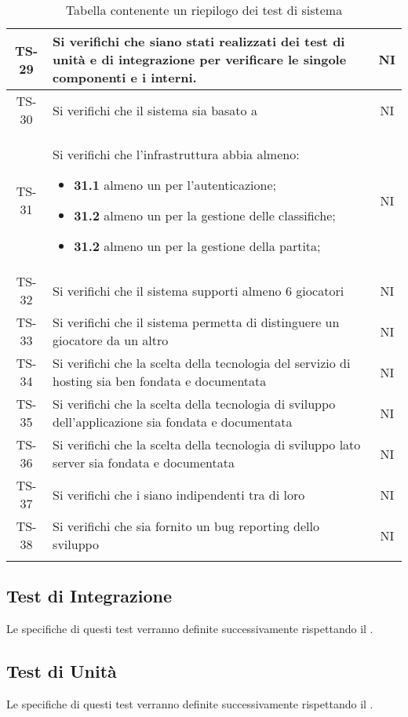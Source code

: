 \begin{center}
\begin{longtable}{|c|p{10cm}|c|}
			 \hline
			 TS-29 & Si verifichi che siano stati realizzati dei test di unità e di integrazione per verificare le singole componenti e i \glock{subsystem} interni. & NI \\
			 \hline
			 TS-30 & Si verifichi che il sistema sia basato a \glock{microservizi} & NI \\
			 \hline
			 TS-31 & Si verifichi che l'infrastruttura abbia almeno: 
			 \begin{itemize}
			 	\item\textbf{31.1} almeno un \glock{microservizio} per l'autenticazione;
			 	\item\textbf{31.2} almeno un \glock{microservizio} per la gestione delle classifiche;
			 	\item\textbf{31.2} almeno un \glock{microservizio} per la gestione della partita;
			 \end{itemize}& NI \\
			 \hline
			 TS-32 & Si verifichi che il sistema supporti almeno 6 giocatori & NI \\
			 \hline
			 TS-33 & Si verifichi che il sistema permetta di distinguere un giocatore da un altro & NI \\
			 \hline
			 TS-34 & Si verifichi che la scelta della tecnologia del servizio di hosting sia ben fondata e documentata & NI \\
			 \hline
			 TS-35 & Si verifichi che la scelta della tecnologia di sviluppo dell'applicazione sia fondata e documentata & NI \\
			 \hline
			 TS-36 & Si verifichi che la scelta della tecnologia di sviluppo lato server sia fondata e documentata & NI \\
			 \hline
			 TS-37 & Si verifichi che i \glock{microservizi} siano indipendenti tra di loro & NI \\ 
			 \hline
			 TS-38 & Si verifichi che sia fornito un bug reporting dello sviluppo & NI \\ 
			 \hline
			 \rowcolor{white}
			 \caption{Tabella contenente un riepilogo dei test di sistema}
			\end{longtable}
		\end{center}


	\subsection{Test di Integrazione}
		Le specifiche di questi test verranno definite successivamente rispettando il . 

	\subsection{Test di Unità}
	 	Le specifiche di questi test verranno definite successivamente rispettando il . 
